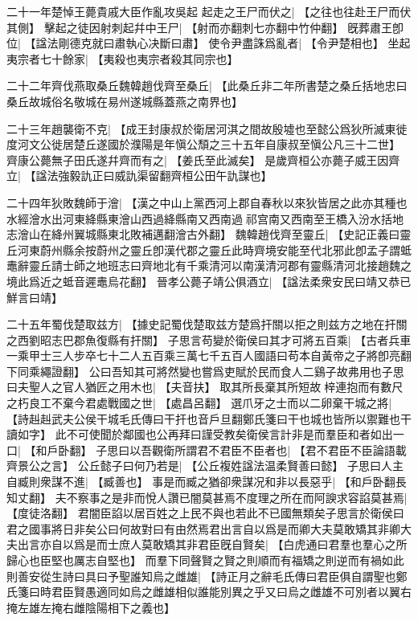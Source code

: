 二十一年楚悼王薨貴戚大臣作亂攻吳起 起走之王尸而伏之|{
	【之往也往赴王尸而伏其側】}
擊起之徒因射刺起幷中王尸|{
	【射而亦翻刺七亦翻中竹仲翻】}
旣葬肅王卽位|{
	【諡法剛德克就曰肅執心决斷曰肅】}
使令尹盡誅爲亂者|{
	【令尹楚相也】}
坐起夷宗者七十餘家|{
	【夷殺也夷宗者殺其同宗也】}
\par
二十二年齊伐燕取桑丘魏韓趙伐齊至桑丘|{
	【此桑丘非二年所書楚之桑丘括地忠曰桑丘故城俗名敬城在易州遂城縣蓋燕之南界也】}
\par
二十三年趙襲衛不克|{
	【成王封康叔於衛居河淇之間故殷墟也至懿公爲狄所滅東徙度河文公徙居楚丘遂國於濮陽是年愼公頹之三十五年自康叔至愼公凡三十二世】}
齊康公薨無子田氏遂幷齊而有之|{
	【姜氏至此滅矣】}
是歲齊桓公亦薨子威王因齊立|{
	【諡法強毅訅正曰威訅渠留翻齊桓公田午訅謀也】}
\par
二十四年狄敗魏師于澮|{
	【漢之中山上黨西河上郡自春秋以來狄皆居之此亦其種也水經澮水出河東絳縣東澮山西過絳縣南又西南過祁宫南又西南至王橋入汾水括地志澮山在絳州翼城縣東北敗補邁翻澮古外翻】}
魏韓趙伐齊至靈丘|{
	【史記正義曰靈丘河東蔚州縣余按蔚州之靈丘卽漢代郡之靈丘此時齊境安能至代北邪此卽孟子謂蚳鼃辭靈丘請士師之地班志曰齊地北有千乘清河以南漢清河郡有靈縣清河北接趙魏之境此爲近之蚳音遲鼃烏花翻】}
晉孝公薨子靖公俱酒立|{
	【諡法柔衆安民曰靖又恭已鮮言曰靖】}
\par
二十五年蜀伐楚取兹方|{
	【據史記蜀伐楚取兹方楚爲扞關以拒之則兹方之地在扞關之西劉昭志巴郡魚復縣有扞關】}
子思言苟變於衛侯曰其才可將五百乘|{
	【古者兵車一乘甲士三人步卒七十二人五百乘三萬七千五百人國語曰苟本自黃帝之子將卽亮翻下同乘繩證翻】}
公曰吾知其可將然變也嘗爲吏賦於民而食人二鷄子故弗用也子思曰夫聖人之官人猶匠之用木也|{
	【夫音扶】}
取其所長棄其所短故梓連抱而有數尺之朽良工不棄今君處戰國之世|{
	【處昌呂翻】}
選爪牙之士而以二卵棄干城之將|{
	【詩赳赳武夫公侯干城毛氏傳曰干扞也音戶旦翻鄭氏箋曰干也城也皆所以禦難也干讀如字】}
此不可使聞於鄰國也公再拜曰謹受教矣衛侯言計非是而羣臣和者如出一口|{
	【和戶卧翻】}
子思曰以吾觀衛所謂君不君臣不臣者也|{
	【君不君臣不臣論語載齊景公之言】}
公丘懿子曰何乃若是|{
	【公丘複姓諡法温柔賢善曰懿】}
子思曰人主自臧則衆謀不進|{
	【臧善也】}
事是而臧之猶卻衆謀况和非以長惡乎|{
	【和戶卧翻長知丈翻】}
夫不察事之是非而悅人讚已闇莫甚焉不度理之所在而阿諛求容諂莫甚焉|{
	【度徒洛翻】}
君闇臣諂以居百姓之上民不與也若此不已國無類矣子思言於衛侯曰君之國事將日非矣公曰何故對曰有由然焉君出言自以爲是而卿大夫莫敢矯其非卿大夫出言亦自以爲是而士庶人莫敢矯其非君臣旣自賢矣|{
	【白虎通曰君羣也羣心之所歸心也臣堅也厲志自堅也】}
而羣下同聲賢之賢之則順而有福矯之則逆而有禍如此則善安從生詩曰具曰予聖誰知烏之雌雄|{
	【詩正月之辭毛氏傳曰君臣俱自謂聖也鄭氏箋曰時君臣賢愚適同如烏之雌雄相似誰能別異之乎又曰烏之雌雄不可別者以翼右掩左雄左掩右雌陰陽相下之義也】}
